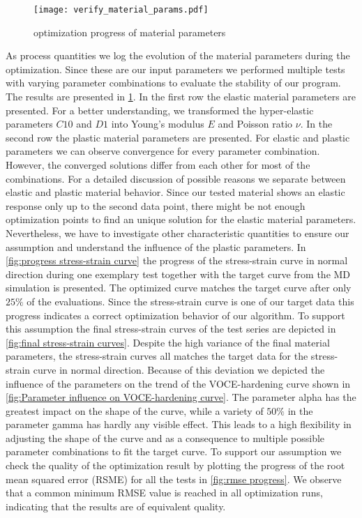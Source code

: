     \begin{figure}[H]
		\centering
        \texttt{[image: verify\_material\_params.pdf]}
		\caption{optimization progress of material parameters}
		\label{fig:materialparameters}
	\end{figure}
    As process quantities we log the evolution of the material parameters during the optimization. Since these are our input parameters we performed multiple tests with varying parameter combinations to evaluate the stability of our program. The results are presented in \ref{fig:materialparameters}. In the first row the elastic material parameters are presented. For a better understanding, we transformed the hyper-elastic parameters \(C10\) and \(D1\) into Young's modulus \(E\) and Poisson ratio \(\nu\). In the second row the plastic material parameters are presented. For elastic and plastic parameters we can observe convergence for every parameter combination. However, the converged solutions differ from each other for most of the combinations. 
    For a detailed discussion of possible reasons we separate between elastic and plastic material behavior. Since our tested material shows an elastic response only up to the second data point, there might be not enough optimization points to find an unique solution for the elastic material parameters. Nevertheless, we have to investigate other characteristic quantities to ensure our assumption and understand the influence of the plastic parameters. In \autoref{fig:progress stress-strain curve} the progress of the stress-strain curve in normal direction during one exemplary test together with the target curve from the MD simulation is presented. The optimized curve matches the target curve after only  \(25 \%\) of the evaluations. Since the stress-strain curve is one of our target data this progress indicates a correct optimization behavior of our algorithm. To support this assumption the final stress-strain curves of the test series are depicted in \autoref{fig:final stress-strain curves}. Despite the high variance of the final material parameters, the stress-strain curves all matches the target data for the stress-strain curve in normal direction. Because of this deviation we depicted the influence of the parameters on the trend of the VOCE-hardening curve shown in \autoref{fig:Parameter influence on VOCE-hardening curve}. The parameter alpha has the greatest impact on the shape of the curve, while a variety of \(50\%\) in the parameter gamma has hardly any visible effect. This leads to a high flexibility in adjusting the shape of the curve and as a consequence to multiple possible parameter combinations to fit the target curve. To support our assumption we check the quality of the optimization result by plotting the progress of the root mean squared error (RSME) for all the tests in \autoref{fig:rmse progress}. We observe that a common minimum RMSE value is reached in all optimization runs, indicating that the results are of equivalent quality. 
